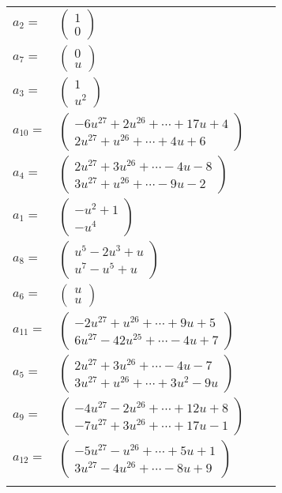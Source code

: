 \documentclass[1p]{elsarticle_modified}
\theoremstyle{definition}
\begin{document}
\begin{tabular}{m{7pt} m{180pt} m{7pt} m{180pt} }
\flushright $a_{2}=$&$\begin{pmatrix}1\\0\end{pmatrix}$ \\
\flushright $a_{7}=$&$\begin{pmatrix}0\\u\end{pmatrix}$ \\
\flushright $a_{3}=$&$\begin{pmatrix}1\\u^2\end{pmatrix}$ \\
\flushright $a_{10}=$&$\begin{pmatrix}-6 u^{27}+2 u^{26}+\cdots+17 u+4\\2 u^{27}+u^{26}+\cdots+4 u+6\end{pmatrix}$ \\
\flushright $a_{4}=$&$\begin{pmatrix}2 u^{27}+3 u^{26}+\cdots-4 u-8\\3 u^{27}+u^{26}+\cdots-9 u-2\end{pmatrix}$ \\
\flushright $a_{1}=$&$\begin{pmatrix}- u^2+1\\- u^4\end{pmatrix}$ \\
\flushright $a_{8}=$&$\begin{pmatrix}u^5-2 u^3+u\\u^7- u^5+u\end{pmatrix}$ \\
\flushright $a_{6}=$&$\begin{pmatrix}u\\u\end{pmatrix}$ \\
\flushright $a_{11}=$&$\begin{pmatrix}-2 u^{27}+u^{26}+\cdots+9 u+5\\6 u^{27}-42 u^{25}+\cdots-4 u+7\end{pmatrix}$ \\
\flushright $a_{5}=$&$\begin{pmatrix}2 u^{27}+3 u^{26}+\cdots-4 u-7\\3 u^{27}+u^{26}+\cdots+3 u^2-9 u\end{pmatrix}$ \\
\flushright $a_{9}=$&$\begin{pmatrix}-4 u^{27}-2 u^{26}+\cdots+12 u+8\\-7 u^{27}+3 u^{26}+\cdots+17 u-1\end{pmatrix}$ \\
\flushright $a_{12}=$&$\begin{pmatrix}-5 u^{27}- u^{26}+\cdots+5 u+1\\3 u^{27}-4 u^{26}+\cdots-8 u+9\end{pmatrix}$\\&\end{tabular}
\end{document}
